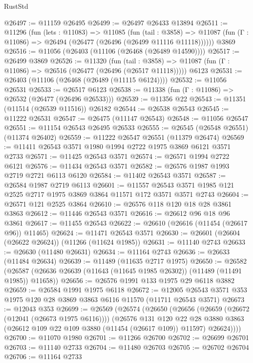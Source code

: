 \begin{lexlean}{RustStd}
\begin{coremodule}
@26497 := @11159 @26495
@26499 := @26497 @26433 @13894
@26511 := @11296
    (fun (lets : @11083) =>
    @11085
      (fun (tail : @3858) =>
      @11087 (fun (Γ : @11086) => @26494 (@26477 (@26496 (@26499 @11116 @11118))))))
    @3869
@26516 := @11056 (@26403 (@11106 (@26468 (@26489 @14590))))
@26517 := @26499 @3869
@26526 := @11320
    (fun (tail : @3858) => @11087 (fun (Γ : @11086) => @26516 (@26477 (@26496 (@26517 @11118)))))
    @6123
@26531 := @26403 (@11106 (@26468 (@26489 (@11115 @6124))))
@26532 := @11056 @26531
@26533 := @26517 @6123
@26538 := @11338 (fun (Γ : @11086) => @26532 (@26477 (@26496 @26533)))
@26539 := @11356 @22
@26543 := @11351 (@11514 (@26539 @11516)) @26182
@26544 := @26538 @26543
@26545 := @11222 @26531
@26547 := @26475 (@11147 @26543)
@26548 := @11056 @26547
@26551 := @11154 @26543 @26495 @26533
@26555 := @26545 (@26548 @26551) (@11374 @26402)
@26559 := @11222 @26547 @26551 (@11379 @26474)
@26569 := @11411 @26543 @3571 @1980 @1994 @2722 @1975 @3869 @6121 @3571 @2733
@26571 := @11425 @26543 @3571
@26574 := @26571 @1994 @2722 @6121
@26576 := @11434 @26543 @3571
@26582 := @26576 @1987 @1993 @2719 @2721 @6113 @6120
@26584 := @11402 @26543 @3571
@26587 := @26584 @1987 @2719 @6113
@26601 := @11557 @26543 @3571 @1985 @121 @2525 @2717 @1975 @3869 @3864 @11571 @172 @3571 @3571 @2743
@26604 := @26571 @121 @2525 @3864
@26610 := @26576 @118 @120 @18 @28 @3861 @3863
@26612 := @11446 @26543 @3571
@26616 := @26612 @96 @18 @96 @3861
@26617 := @11455 @26543
@26622 := @26610 (@26616 (@11454 (@26617 @96)) @11465)
@26624 := @11471 @26543 @3571
@26630 := @26601 (@26604 (@26622 @26624)) (@11266 (@11624 @1985))
@26631 := @11140 @2743
@26633 := @26630 (@11480 @26631)
@26634 := @11164 @2743
@26636 := @26633 (@11484 @26634)
@26639 := @11489 (@11635 @2717 @1975)
@26650 := @26582
    (@26587 (@26636 @26639 (@11643 (@11645 @1985 @26302)) (@11489 (@11491 @1985)) @11658))
@26656 := @26576 @1991 @133 @1975 @29 @6118 @3882
@26659 := @26584 @1991 @1975 @6118
@26672 := @12005 @26543 @3571 @353 @1975 @120 @28 @3869 @3863 @6116 @11570 (@11711 @26543 @3571)
@26673 := @12043 @353
@26699 := @26569
    (@26574
      (@26650
        (@26656
          (@26659 (@26672 (@12041 (@26673 @1975 @6116))))
          (@26576
            @131
            @120
            @22
            @28
            @3880
            @3863
            (@26612 @109 @22 @109 @3880 (@11454 (@26617 @109)) @11597)
            @26624))))
@26700 := @11070 @1980
@26701 := @11266 @26700
@26702 := @26699 @26701
@26703 := @11140 @2733
@26704 := @11480 @26703
@26705 := @26702 @26704
@26706 := @11164 @2733

\end{coremodule}
\end{lexlean}
